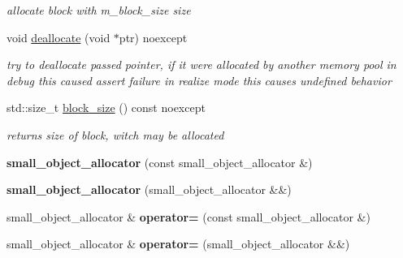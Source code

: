 \begin{CompactItemize}
\begin{CompactList}\small\item\em allocate block with m\_\-block\_\-size size \item\end{CompactList}\item 
\hypertarget{structhope_1_1memory_1_1final_da58e8008844f554080b7ebd9513035d}{
void \hyperlink{structhope_1_1memory_1_1final_da58e8008844f554080b7ebd9513035d}{deallocate} (void $\ast$ptr) noexcept}
\label{structhope_1_1memory_1_1final_da58e8008844f554080b7ebd9513035d}

\begin{CompactList}\small\item\em try to deallocate passed pointer, if it were allocated by another memory pool in debug this caused assert failure in realize mode this causes undefined behavior \item\end{CompactList}\item 
\hypertarget{structhope_1_1memory_1_1final_f6bf303e9162923afc80ef1b3081a1fa}{
std::size\_\-t \hyperlink{structhope_1_1memory_1_1final_f6bf303e9162923afc80ef1b3081a1fa}{block\_\-size} () const noexcept}
\label{structhope_1_1memory_1_1final_f6bf303e9162923afc80ef1b3081a1fa}

\begin{CompactList}\small\item\em returns size of block, witch may be allocated \item\end{CompactList}\item 
\hypertarget{structhope_1_1memory_1_1final_574fe43c8a88fab43e213dd568f1db78}{
\textbf{small\_\-object\_\-allocator} (const small\_\-object\_\-allocator \&)}
\label{structhope_1_1memory_1_1final_574fe43c8a88fab43e213dd568f1db78}

\item 
\hypertarget{structhope_1_1memory_1_1final_4e4c83e609c448a110754eb8b68c3096}{
\textbf{small\_\-object\_\-allocator} (small\_\-object\_\-allocator \&\&)}
\label{structhope_1_1memory_1_1final_4e4c83e609c448a110754eb8b68c3096}

\item 
\hypertarget{structhope_1_1memory_1_1final_6c1420340012d0490acff1905652b81c}{
small\_\-object\_\-allocator \& \textbf{operator=} (const small\_\-object\_\-allocator \&)}
\label{structhope_1_1memory_1_1final_6c1420340012d0490acff1905652b81c}

\item 
\hypertarget{structhope_1_1memory_1_1final_bfd98ecd6fb623123d8bf2870e696953}{
small\_\-object\_\-allocator \& \textbf{operator=} (small\_\-object\_\-allocator \&\&)}
\label{structhope_1_1memory_1_1final_bfd98ecd6fb623123d8bf2870e696953}


\end{CompactItemize}
